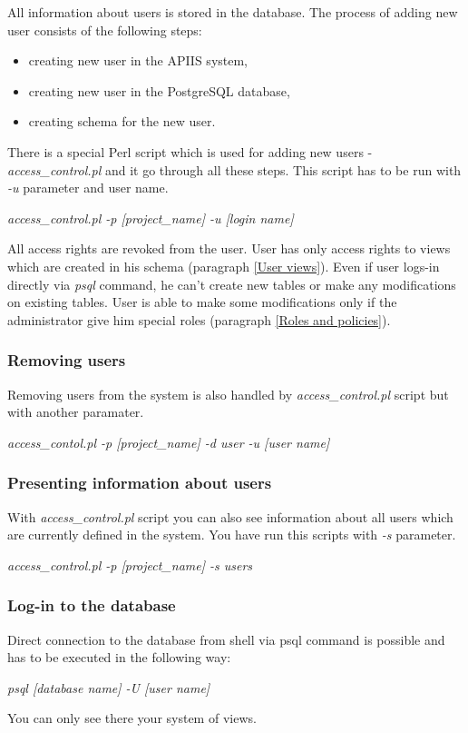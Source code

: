 All information about users is stored in the database. The process of adding new user consists of the following steps:
\begin{itemize}
\item creating new user in the APIIS system,
\item creating new user in the PostgreSQL database,
\item creating schema for the new user.
\end{itemize} 
There is a special Perl script which is used for adding new users - \textit{access\_control.pl} and it go through all these  steps. This script has to be run with \textit{-u }parameter and user name.
\begin{center}
\textit{access\_control.pl -p [project\_name] -u [login name]}
\end{center}
All access rights are revoked from the user. User has only access rights to views which are created in his schema (paragraph \ref{User views}). Even if user logs-in directly via \textit{psql} command, he can't create new tables or make any modifications on existing tables. User is able to make some modifications only if the administrator give him special roles (paragraph \ref{Roles and policies}). 

\subsubsection{Removing users}
	Removing users from the system is also handled by \textit{access\_control.pl} script but with another paramater.
\begin{center}
\textit{access\_contol.pl -p [project\_name] -d user -u [user name]}
\end{center}

\subsubsection{Presenting information about users}
With \textit{access\_control.pl}  script you can also see information about all users which are currently defined in the system. You have run this scripts with \textit{-s} parameter.
\begin{center}
\textit{
access\_control.pl -p [project\_name] -s users}
\end{center}

\subsubsection{Log-in to the database}
Direct connection to the database from shell via psql command is possible and has to be executed in the following way:
\begin{center}
\textit{psql [database name] -U [user name]}
\end{center}
You can only see there your system of views.


